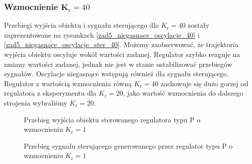 \subsubsection{Wzmocnienie $\mathbf{K_{\mathrm{r}}} = \num{40}$} 
Przebiegi wyjścia obiektu i sygnału sterującego dla $K_{\mathrm{r}} = \num{40}$ zostały zaprezentowane na rysunkach \ref{zad5_niegasnace_oscylacje_40} i \ref{zad5_niegasnace_oscylacje_ster_40}. Możemy zaobserwować, że trajektoria wyjścia obiektu oscyluje wokół wartości zadanej. Regulator szybko reaguje na zmiany wartości zadanej, jednak nie jest w stanie ustabilizować przebiegów sygnałów. Oscylacje niegasnące wstępują również dla sygnału sterującego. Regulator z wartością wzmocnienia równą $K_{\mathrm{r}} = \num{40}$ zachowuje się dużo gorzej od regulatora z eksperymentu dla $K_{\mathrm{r}} = \num{20}$, jako wartość wzmocnienia do dalszego strojenia wybraliśmy $K_{\mathrm{r}} = \num{20}$.

\begin{figure}[t]
    \centering
    \caption{Przebieg wyjścia obiektu sterowanego regulatora typu P o wzmocnieniu $K_{\mathrm{r}} = \num{1}$}
    \label{zad5_niegasnace_oscylacje}
\end{figure}

\begin{figure}[b]
    \centering
    \caption{Przebieg sygnału sterującego generowanego przez regulator typu P o wzmocnieniu $K_{\mathrm{r}} = \num{1}$}
    \label{zad5_niegasnace_oscylacje_ster}
\end{figure}
\FloatBarrier

